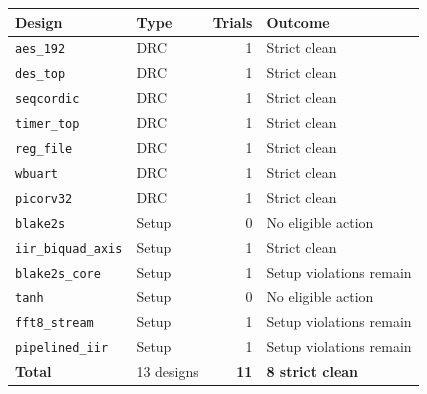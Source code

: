 \begin{tabular}{llrl}\toprule
Design & Type & Trials & Outcome\\\midrule
\texttt{aes\_192} & DRC & 1 & Strict clean\\
\texttt{des\_top} & DRC & 1 & Strict clean\\
\texttt{seqcordic} & DRC & 1 & Strict clean\\
\texttt{timer\_top} & DRC & 1 & Strict clean\\
\texttt{reg\_file} & DRC & 1 & Strict clean\\
\texttt{wbuart} & DRC & 1 & Strict clean\\
\texttt{picorv32} & DRC & 1 & Strict clean\\
\texttt{blake2s} & Setup & 0 & No eligible action\\
\texttt{iir\_biquad\_axis} & Setup & 1 & Strict clean\\
\texttt{blake2s\_core} & Setup & 1 & Setup violations remain\\
\texttt{tanh} & Setup & 0 & No eligible action\\
\texttt{fft8\_stream} & Setup & 1 & Setup violations remain\\
\texttt{pipelined\_iir} & Setup & 1 & Setup violations remain\\
\midrule
\textbf{Total} & 13 designs & \textbf{11} & \textbf{8 strict clean}\\
\bottomrule\end{tabular}
